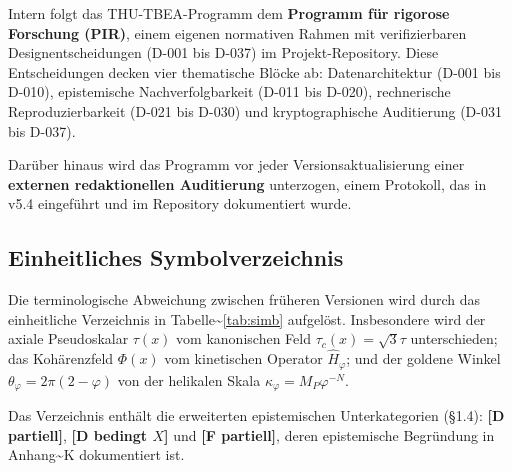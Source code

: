﻿\documentclass[11pt,letterpaper]{article}
\begin{document}
Intern folgt das THU-TBEA-Programm dem \textbf{Programm für rigorose Forschung (PIR)}, einem eigenen normativen Rahmen mit verifizierbaren Designentscheidungen (D-001 bis D-037) im Projekt-Repository. Diese Entscheidungen decken vier thematische Blöcke ab: Datenarchitektur (D-001 bis D-010), epistemische Nachverfolgbarkeit (D-011 bis D-020), rechnerische Reproduzierbarkeit (D-021 bis D-030) und kryptographische Auditierung (D-031 bis D-037).

Darüber hinaus wird das Programm vor jeder Versionsaktualisierung einer \textbf{externen redaktionellen Auditierung} unterzogen, einem Protokoll, das in v5.4 eingeführt und im Repository dokumentiert wurde.
\subsection{Einheitliches Symbolverzeichnis}
Die terminologische Abweichung zwischen früheren Versionen wird durch das einheitliche Verzeichnis in Tabelle\textasciitilde{}\ref{tab:simb} aufgelöst. Insbesondere wird der axiale Pseudoskalar $\tau(x)$ vom kanonischen Feld $\tau_c(x) = \sqrt{3}\tau$ unterschieden; das Kohärenzfeld $\Phi(x)$ vom kinetischen Operator $\hat{H}_\varphi$; und der goldene Winkel $\theta_\varphi = 2\pi(2-\varphi)$ von der helikalen Skala $\kappa_\varphi = M_P \varphi^{-N}$.

Das Verzeichnis enthält die erweiterten epistemischen Unterkategorien (§1.4): \textbf{[D partiell]}, \textbf{[D bedingt $X$]} und \textbf{[F partiell]}, deren epistemische Begründung in Anhang\textasciitilde{}K dokumentiert ist.
\end{document}
